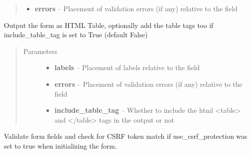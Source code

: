 \documentclass[letterpaper,10pt,english]{sphinxmanual}
\begin{document}
\begin{fulllineitems}
\begin{fulllineitems}
\begin{quote}
\begin{description}
\begin{itemize}
\item {} 
\textbf{errors} -- Placement of validation errors (if any) relative to the field

\end{itemize}

\end{description}\end{quote}

\end{fulllineitems}


\begin{fulllineitems}
\label{pyck-forms:pyck.forms.Form.as_table}
Output the form as HTML Table, optionally add the table tags too if include\_table\_tag is set to True (default False)
\begin{quote}\begin{description}
\item[{Parameters}] \leavevmode\begin{itemize}
\item {} 
\textbf{labels} -- Placement of labels relative to the field

\item {} 
\textbf{errors} -- Placement of validation errors (if any) relative to the field

\item {} 
\textbf{include\_table\_tag} -- Whether to include the html \textless{}table\textgreater{} and \textless{}/table\textgreater{} tags in the output or not

\end{itemize}

\end{description}\end{quote}

\end{fulllineitems}


\begin{fulllineitems}
\label{pyck-forms:pyck.forms.Form.validate}
Validate form fields and check for CSRF token match if use\_csrf\_protection was set to true when
initializing the form.

\end{fulllineitems}


\end{fulllineitems}
\end{document}
